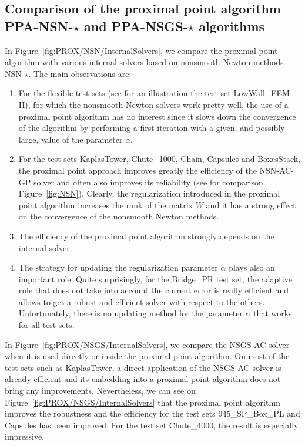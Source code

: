 \subsection{Comparison of the proximal point algorithm {\sf PPA-NSN-$\star$} and {\sf PPA-NSGS-$\star$}  algorithms}
\label{Sec:PROX/NSN/InternalSolvers}
In Figure~\ref{fig:PROX/NSN/InternalSolvers}, we compare the proximal point algorithm with various internal solvers based on nonsmooth Newton methods {\sf NSN-$\star$}. The main observations are:
\begin{enumerate}
\item For the flexible test sets (see for an illustration the test set LowWall\_FEM II), for which the nonsmooth Newton solvers work pretty well, the use of a proximal point algorithm has no interest since it slows down the convergence of the algorithm by performing a first iteration with a given, and possibly large, value of the parameter $\alpha$.
\item For the test sets KaplasTower,   Chute\_1000, Chain, Capsules and BoxesStack, the proximal point approach improves greatly the efficiency  of the {\sf NSN-AC-GP} solver and often also improves its reliability (see for comparison Figure~\ref{fig:NSN}). Clearly, the regularization introduced in the proximal point algorithm increases the rank of the matrix $W$ and it has a strong effect on the convergence of the nonsmooth  Newton methods.
\item The efficiency of the proximal point algorithm strongly depends on the internal solver. 
\item The strategy for updating the regularization parameter $\alpha$ plays also an important role. Quite surprisingly, for the Bridge\_PR test set, the adaptive rule that does not take into account the current error is really efficient and allows to get a robust and efficient solver with respect to the others. Unfortunately, there is no updating method for the parameter $\alpha$ that works for all test sets.
\end{enumerate}
In Figure~\ref{fig:PROX/NSGS/InternalSolvers}, we compare the {\sf NSGS-AC} solver when it is used directly or inside the proximal point algorithm. On most of the test sets such as KaplasTower, a direct application of the {\sf NSGS-AC} solver is already efficient and its embedding into a proximal point algorithm does not bring any improvements. Nevertheless, we can see on Figure~\ref{fig:PROX/NSGS/InternalSolvers} that the proximal point algorithm improves the robustness and the efficiency for the test sets 945\_SP\_Box\_PL  and Capsules has been improved. For the test set Chute\_4000, the result is especially impressive.

